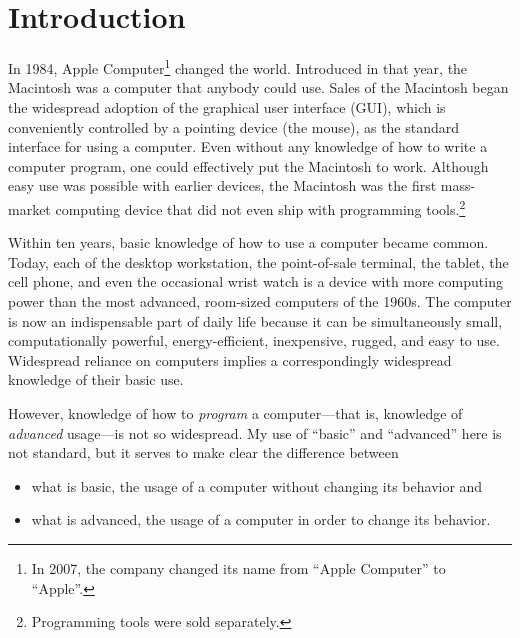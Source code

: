 \documentclass[twocolumn]{book}
\title{\doctitle}
\author{Thomas E. Vaughan}
\begin{document}
\frontmatter

\maketitle

\tableofcontents

\mainmatter

\chapter{Introduction}

In 1984, Apple Computer\footnote{%
   In 2007, the company changed its name from ``Apple Computer'' to ``Apple''.}
changed the world.  Introduced in that year, the Macintosh was a computer that
anybody could use.  Sales of the Macintosh began the widespread adoption of the
graphical user interface (GUI), which is conveniently controlled by a pointing
device (the mouse), as the standard interface for using a computer.  Even
without any knowledge of how to write a computer program, one could effectively
put the Macintosh to work.  Although easy use was possible with earlier
devices, the Macintosh was the first mass-market computing device that did not
even ship with programming tools.\footnote{%
   Programming tools were sold separately.}

Within ten years, basic knowledge of how to use a computer became common.
Today, each of the desktop workstation, the point-of-sale terminal, the tablet,
the cell phone, and even the occasional wrist watch is a device with more
computing power than the most advanced, room-sized computers of the 1960s.  The
computer is now an indispensable part of daily life because it can be
simultaneously small, computationally powerful, energy-efficient, inexpensive,
rugged, and easy to use. Widespread reliance on computers implies a
correspondingly widespread knowledge of their basic use.

However, knowledge of how to \emph{program} a computer---that is, knowledge of
\emph{advanced} usage---is not so widespread.  My use of ``basic'' and
``advanced'' here is not standard, but it serves to make clear the difference
between
\begin{itemize}
   \item what is basic, the usage of a computer without changing its behavior
      and
   \item what is advanced, the usage of a computer in order to change its
      behavior.
\end{itemize}
\end{document}
